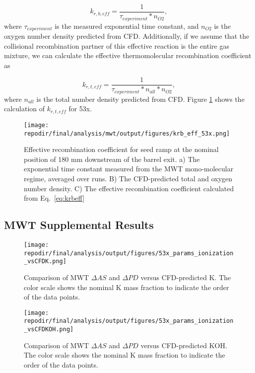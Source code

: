 \begin{equation}
    \label{eq:krbeff}
    k_{r,b,eff} = \frac{1}{\tau_{experiment} *  n_{O2}},
\end{equation}
where $\tau_{experiment}$ is the measured exponential time constant,  and $n_{O2}$ is the oxygen number density predicted from CFD. Additionally, if we assume that the collisional recombination partner of this effective reaction is the entire gas mixture, we can calculate the effective thermomolecular recombination coefficient as


\begin{equation}
    \label{eq:krteff}
    k_{r,t,eff} = \frac{1}{\tau_{experiment} * n_{all} *  n_{O2}},
\end{equation}
where $n_{all}$ is the total number density predicted from CFD. Figure \ref{fig:SI_krb_eff_53x} shows the calculation of $k_{r,t,eff}$ for 53x.

\begin{figure}[]
\centering
\texttt{[image: \\repodir/final/analysis/mwt/output/figures/krb\_eff\_53x.png]}
\caption{Effective recombination coefficient for seed ramp at the nominal position of 180 mm downstream of the barrel exit. a) The exponential time constant measured from the MWT mono-molecular regime, averaged over runs. B) The CFD-predicted total and oxygen number density. C) The effective recombination coefficient calculated from Eq.\ \ref{eq:krbeff}}%
\label{fig:SI_krb_eff_53x}
\end{figure}

\subsection{MWT Supplemental Results}

\begin{figure}[h]
    \centering
    \texttt{[image: \\repodir/final/analysis/output/figures/53x\_params\_ionization\_vsCFDK.png]} 
    \caption{Comparison of MWT $\Delta AS$ and $\Delta PD$ versus CFD-predicted K. The color scale shows the nominal K mass fraction to indicate the order of the data points.}
    \label{fig:SI_53x_params_ionization_vsCFDK}
\end{figure}

\begin{figure}[h]
    \centering
    \texttt{[image: \\repodir/final/analysis/output/figures/53x\_params\_ionization\_vsCFDKOH.png]} 
    \caption{Comparison of MWT $\Delta AS$ and $\Delta PD$ versus CFD-predicted KOH. The color scale shows the nominal K mass fraction to indicate the order of the data points.}
    \label{fig:SI_53x_params_ionization_vsCFDKOH}
\end{figure}



